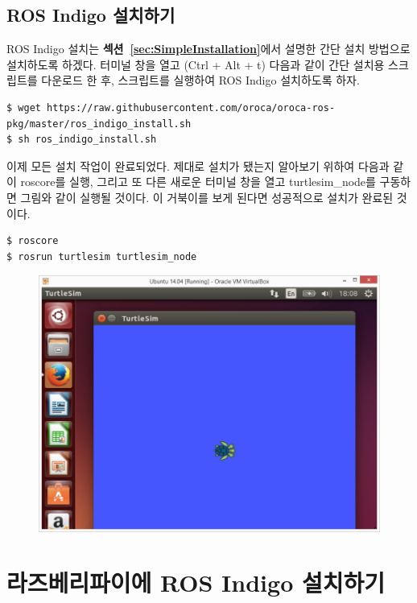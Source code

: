 \subsection{ROS Indigo 설치하기}

ROS Indigo 설치는 \textbf{섹션~\ref{sec:SimpleInstallation}}에서 설명한 간단 설치 방법으로 설치하도록 하겠다. 터미널 창을 열고 (Ctrl + Alt + t) 다음과 같이 간단 설치용 스크립트를 다운로드 한 후, 스크립트를 실행하여 ROS Indigo 설치하도록 하자.

\begin{lstlisting}[language=ROS]
$ wget https://raw.githubusercontent.com/oroca/oroca-ros-pkg/master/ros_indigo_install.sh
$ sh ros_indigo_install.sh
\end{lstlisting}

이제 모든 설치 작업이 완료되었다. 제대로 설치가 됐는지 알아보기 위하여 다음과 같이 roscore를 실행, 그리고 또 다른 새로운 터미널 창을 열고 turtlesim\_node를 구동하면 그림와 같이 실행될 것이다. 이 거북이를 보게 된다면 성공적으로 설치가 완료된 것이다.

\begin{lstlisting}[language=ROS]
$ roscore
$ rosrun turtlesim turtlesim_node
\end{lstlisting}

\begin{figure}[h]
\centering
\includegraphics[width=0.49\columnwidth]{pictures/chapter3/vm24.png}
\end{figure}

\newpage
\section{라즈베리파이에 ROS Indigo 설치하기}

